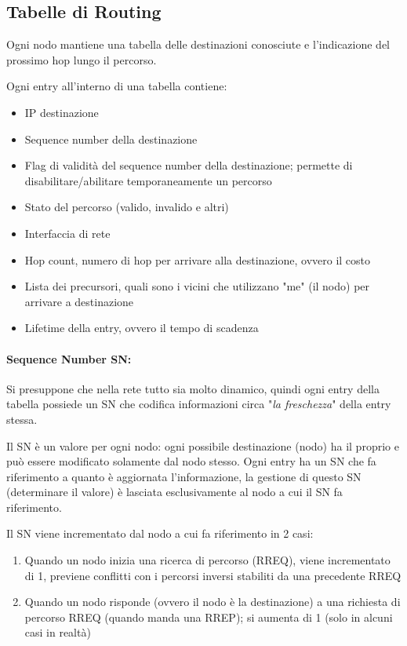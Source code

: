 \subsection{Tabelle di Routing}

Ogni nodo mantiene una tabella delle destinazioni conosciute e l'indicazione del prossimo hop lungo il percorso. 

Ogni entry all'interno di una tabella contiene:
\begin{itemize}
	\item IP destinazione

	\item Sequence number della destinazione

	\item Flag di validità del sequence number della destinazione; permette di disabilitare/abilitare temporaneamente un percorso

	\item Stato del percorso (valido, invalido e altri)

	\item Interfaccia di rete

	\item Hop count, numero di hop per arrivare alla destinazione, ovvero il costo

	\item Lista dei precursori, quali sono i vicini che utilizzano "me" (il nodo) per arrivare a destinazione

	\item Lifetime della entry, ovvero il tempo di scadenza
\end{itemize}

\paragraph{Sequence Number SN:} Si presuppone che nella rete tutto sia molto dinamico, quindi ogni entry della tabella possiede un SN che codifica informazioni circa "\textit{la freschezza}" della entry stessa. 

Il SN è un valore per ogni nodo: ogni possibile destinazione (nodo) ha il proprio e può essere modificato solamente dal nodo stesso. Ogni entry ha un SN che fa riferimento a quanto è aggiornata l'informazione, la gestione di questo SN (determinare il valore) è lasciata esclusivamente al nodo a cui il SN fa riferimento. 

Il SN viene incrementato dal nodo a cui fa riferimento in 2 casi: 
\begin{enumerate}
	\item Quando un nodo inizia una ricerca di percorso (RREQ), viene incrementato di 1, previene conflitti con i percorsi inversi stabiliti da una precedente RREQ

	\item Quando un nodo risponde (ovvero il nodo è la destinazione) a una richiesta di percorso RREQ (quando manda una RREP); si aumenta di 1 (solo in alcuni casi in realtà)
\end{enumerate}

